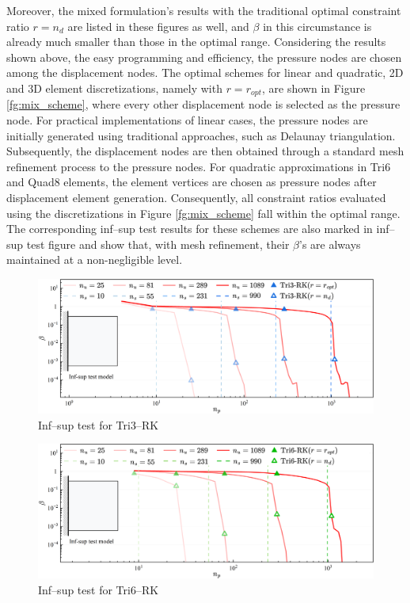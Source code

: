Moreover, the mixed formulation's results with the traditional optimal constraint ratio $r=n_d$ are listed in these figures as well, and $\beta$ in this circumstance is already much smaller than those in the optimal range. Considering the results shown above, the easy programming and efficiency, the pressure nodes are chosen among the displacement nodes.
The optimal schemes for linear and quadratic, 2D and 3D element discretizations, namely with $r=r_{opt}$, are shown in Figure \ref{fg:mix_scheme},
where every other displacement node is selected as the pressure node.
For practical implementations of linear cases, the pressure nodes are initially generated using traditional approaches, such as Delaunay triangulation.
Subsequently, the displacement nodes are then obtained through a standard mesh refinement process to the pressure nodes.
For quadratic approximations in Tri6 and Quad8 elements, the element vertices are chosen as pressure nodes after displacement element generation.
Consequently, all constraint ratios evaluated using the discretizations in Figure \ref{fg:mix_scheme} fall within the optimal range.
The corresponding inf--sup test results for these schemes are also marked in inf--sup test figure and show that, with mesh refinement, their $\beta$'s are always maintained at a non-negligible level.

\begin{figure}[H]
\centering
\includegraphics[width=\textwidth]{tri3.png}
\caption{Inf--sup test for Tri3--RK}\label{fg:infsup_convergence_2D_a}
\end{figure}

\begin{figure}[H]
\centering
\includegraphics[width=\textwidth]{tri6.png}\caption{Inf--sup test for Tri6--RK}\label{fg:infsup_convergence_2D_b}
\end{figure}


